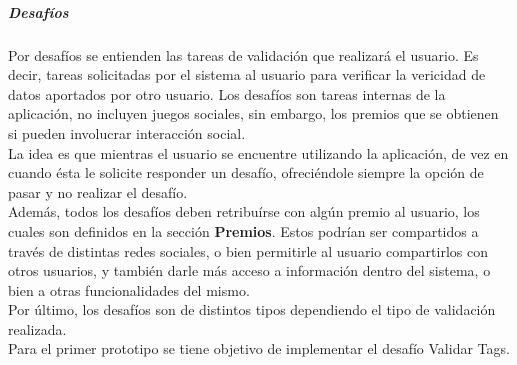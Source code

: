 \documentclass[10pt,letterpaper]{article}
\begin{document}
\subparagraph{Desafíos}

Por desafíos se entienden las tareas de validación que realizará el usuario. Es decir, tareas solicitadas por el sistema al usuario para verificar la vericidad de datos aportados por otro usuario. Los desafíos son tareas internas de la aplicación, no incluyen juegos sociales, sin embargo, los premios que se obtienen si pueden involucrar interacción social.\\

La idea es que mientras el usuario se encuentre utilizando la aplicación, de vez en cuando ésta le solicite responder un desafío, ofreciéndole siempre la opción de pasar y no realizar el desafío.\\

Además, todos los desafíos deben retribuírse con algún premio al usuario, los cuales son definidos en la sección \textbf{Premios}. Estos podrían ser compartidos a través de distintas redes sociales, o bien permitirle al usuario compartirlos con otros usuarios, y también darle más acceso a información dentro del sistema, o bien a otras funcionalidades del mismo.\\

Por último, los desafíos son de distintos tipos dependiendo el tipo de validación realizada.\\

Para el primer prototipo se tiene objetivo de implementar el desafío Validar Tags.\\
\end{document}
